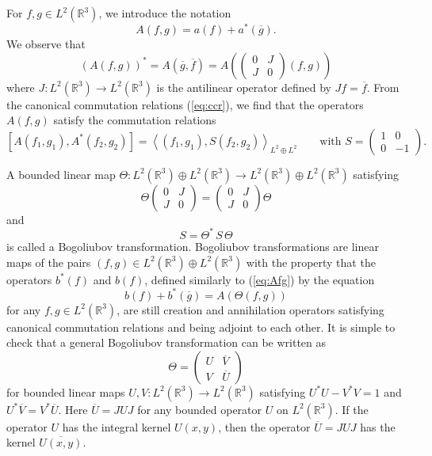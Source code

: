 \documentclass[11pt,a4paper]{article}
\newcommand{\done}{}
\newcommand{\bR}{{\mathbb R}}
\begin{document}
For $f,g \in L^2 (\bR^3)$, we introduce the notation
\begin{equation}\label{eq:Afg} A(f,g) = a(f) + a^* (\overline{g}). \end{equation}
We observe that 
\begin{equation}\label{eq:bog11} 
(A(f,g))^* = A(\overline{g}, \overline{f}) = A \left( \left( \begin{array}{ll} 0 & J \\ J & 0 \end{array} \right) (f,g) \right)\end{equation}
where $J:L^2 (\bR^3) \to L^2 (\bR^3)$ is the antilinear operator defined by $Jf = \overline{f}$. {F}rom the canonical commutation relations (\ref{eq:ccr}), we find that the operators $A(f,g)$ satisfy the commutation relations
\begin{equation}\label{eq:bog22} \left[ A(f_1, g_1) , A^* (f_2, g_2) \right] = \left\langle (f_1, g_1) , S (f_2, g_2) \right\rangle_{L^2 \oplus L^2} \qquad \text{with } S = \left( \begin{array}{ll} 1 & 0 \\ 0 & -1 \end{array} \right). \end{equation}

A bounded linear map $\Theta : L^2 (\bR^3) \oplus L^2 (\bR^3) \to L^2 (\bR^3) \oplus L^2 (\bR^3)$ satisfying
\begin{equation}\label{eq:bog1}
\Theta \left( \begin{array}{ll} 0 & J \\ J & 0 \end{array} \right) = \left( \begin{array}{ll} 0 & J \\ J & 0 \end{array} \right) \Theta \end{equation}
and
\begin{equation}\label{eq:bog2} S = \Theta^* \, S \, \Theta \end{equation}
is called a Bogoliubov transformation. Bogoliubov transformations are linear maps of the pairs $(f,g) \in L^2 (\bR^3) \oplus L^2 (\bR^3)$ with the property that the operators $b^* (f)$ and $b(f)$,\done{} defined similarly to (\ref{eq:Afg}) by the equation \[ b (f) + b^* (\overline{g}) = A (\Theta (f,g)) \] for any $f,g \in L^2 (\bR^3)$, are still creation and annihilation operators satisfying canonical commutation relations and being adjoint to each other. It is simple to check that a general Bogoliubov transformation can be written as  
\begin{equation}\label{eq:theta-UV} \Theta = \left( \begin{array}{ll} U &  \overline{V}  \\ V & \overline{U} \end{array} \right) \end{equation}
for bounded linear maps $U, V: L^2 (\bR^3) \to L^2 (\bR^3)$ satisfying $U^* U - V^* V = 1$ and $U^* \overline{V} = V^*\overline{U}$. Here $\overline{U} = J U J$ for any bounded operator $U$ on $L^2 (\bR^3)$. If the operator $U$ has the integral kernel $U(x,y)$, then the operator $\overline{U} = J U J$ has the kernel $\overline{U(x,y)}$. 
\end{document}
